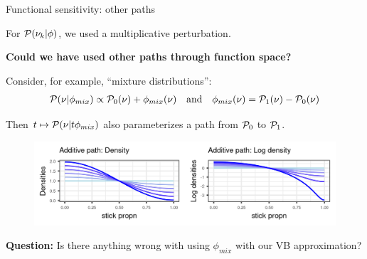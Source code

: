 
\begin{frame}{Functional sensitivity: other paths \citep{gustafson:1996:local}}

For $\mathcal{P}(\nu_{k} \vert \phi)$, we used a multiplicative perturbation.

\vspace{1em}

\begin{mdframed}[style=MyFrame]
\begin{center}
{\bf Could we have used other paths through function space? }
\end{center}
\end{mdframed}

\pause

Consider, for example, ``mixture distributions'':
%
\begin{align*}
\mathcal{P}(\nu \vert \phi_{mix}) \propto{}
\mathcal{P}_{0}(\nu) + \phi_{mix}(\nu)
\quad\textrm{and}\quad
\phi_{mix}(\nu) = \mathcal{P}_{1}(\nu) - \mathcal{P}_{0}(\nu)
\end{align*}

\vspace{-0.5em}
Then $t\mapsto \mathcal{P}(\nu \vert t\phi_{mix})$ also parameterizes a path from
$\mathcal{P}_{0}$ to $\mathcal{P}_{1}$.

\pause

\vspace{-0.5em}
\begin{figure}[!h]
\centering
\includegraphics[width = 0.8\paperwidth]{./figure/lin_path-1.png}
\end{figure}
%

\pause

{\centering
{\bf Question:} Is there anything wrong with using $\phi_{mix}$ with our VB approximation?
}
\end{frame}




